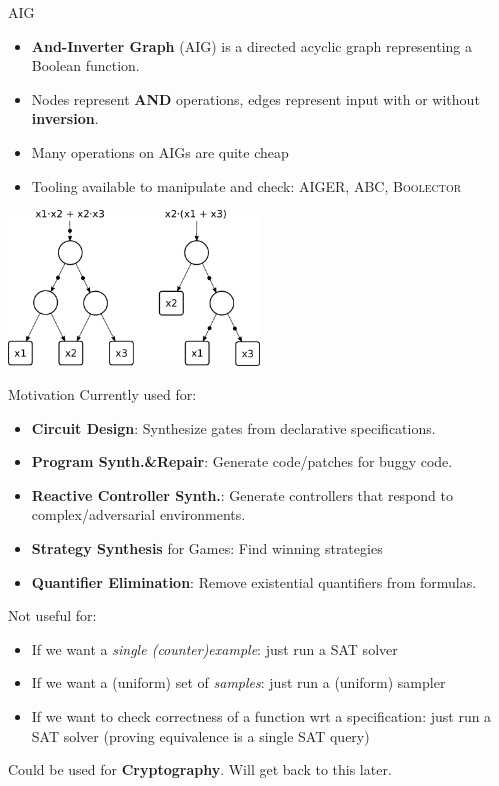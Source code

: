 \documentclass[aspectratio=169]{beamer}
\begin{document}
\begin{frame}{AIG}
\begin{itemize}
    \item \textbf{And-Inverter Graph} (AIG) is a directed acyclic graph
        representing a Boolean function.
    \item Nodes represent \textbf{AND} operations, edges represent
        input with or without \textbf{inversion}.
    \item Many operations on AIGs are quite cheap
    \item Tooling available to manipulate and check: \textsc{AIGER, ABC, Boolector}
\end{itemize}
\bigskip

\begin{center}
\includegraphics[width=0.5\textwidth]{And-inverter-graph.pdf}
\end{center}
\end{frame}

\begin{frame}{Motivation}
Currently used for:
\begin{itemize}
    \item \textbf{Circuit Design}: Synthesize gates from declarative specifications.
    \item \textbf{Program Synth.\&Repair}: Generate code/patches for buggy code.
    \item \textbf{Reactive Controller Synth.}: Generate controllers
        that respond to complex/adversarial environments.
    \item \textbf{Strategy Synthesis} for Games: Find winning strategies
    \item \textbf{Quantifier Elimination}: Remove existential quantifiers from
        formulas.
\end{itemize}
\bigskip

Not useful for:
\begin{itemize}
    \item If we want a \emph{single (counter)example}: just run a SAT solver
    \item If we want a (uniform) set of \emph{samples}: just run a (uniform) sampler
    \item If we want to check correctness of a function wrt a specification:
        just run a SAT solver (proving equivalence is a single SAT query)
\end{itemize}
\bigskip

Could be used for \textbf{Cryptography}. Will get back to this later.
\end{frame}
\end{document}
